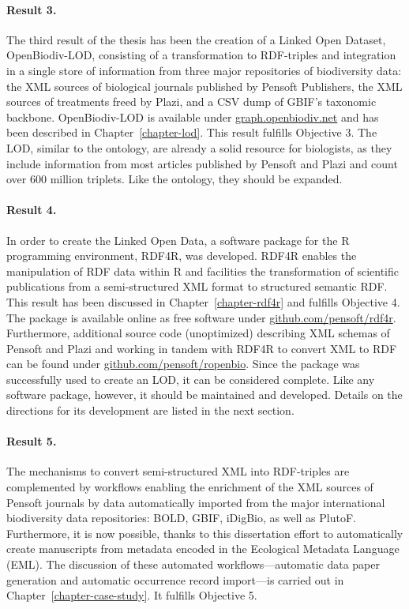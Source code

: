 \paragraph{Result 3.} The third result of the thesis has been the creation of a Linked Open Dataset, OpenBiodiv-LOD, consisting of a transformation to RDF-triples and integration in a single store of information from three major repositories of biodiversity data: the XML sources of biological journals published by Pensoft Publishers, the XML sources of treatments freed by Plazi, and a CSV dump of GBIF's taxonomic backbone. OpenBiodiv-LOD is available under \href{http://graph.openbiodiv.net}{\url{graph.openbiodiv.net}} and has been described in Chapter~\ref{chapter-lod}. This result fulfills Objective 3. The LOD, similar to the ontology, are already a solid resource for biologists, as they include information from most articles published by Pensoft and Plazi and count over 600 million triplets. Like the ontology, they should be expanded.

\paragraph{Result 4.} In order to  create the Linked Open Data, a software package for the R programming environment, RDF4R, was developed. RDF4R enables the manipulation of RDF data within R and facilities the transformation of scientific publications from a semi-structured XML format to structured semantic RDF. This result has been discussed in Chapter~\ref{chapter-rdf4r} and fulfills Objective 4. The package is available online as free software under \href{http://github.com/pensoft/rdf4r}{\url{github.com/pensoft/rdf4r}}. Furthermore, additional source code (unoptimized) describing XML schemas of Pensoft and Plazi and working in tandem with RDF4R to convert XML to RDF can be found under \href{http://github.com/pensoft/ropenbio}{\url{github.com/pensoft/ropenbio}}. Since the package was successfully used to create an LOD, it can be considered complete. Like any software package, however, it should be maintained and developed. Details on the directions for its development are listed in the next section.

\paragraph{Result 5.} The mechanisms to convert semi-structured XML into RDF-triples are complemented by workflows enabling the enrichment of the XML sources of Pensoft journals by data automatically imported from the major international biodiversity data repositories: BOLD, GBIF, iDigBio, as well as PlutoF. Furthermore, it is now possible, thanks to this dissertation effort to automatically create manuscripts from metadata encoded in the Ecological Metadata Language (EML). The discussion of these automated workflows---automatic data paper generation and automatic occurrence record import---is carried out in Chapter~\ref{chapter-case-study}. It fulfills Objective 5.

